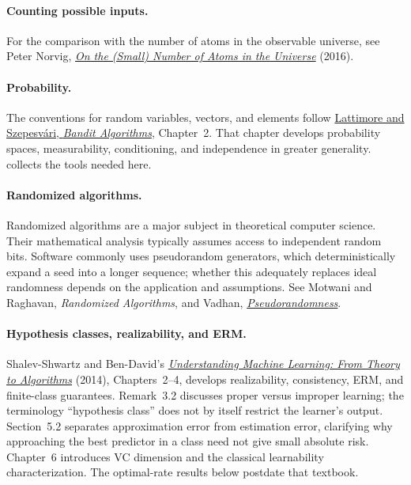 \documentclass[11pt,twoside]{article}
\theoremstyle{definition}
\theoremstyle{remark}
\begin{document}
\paragraph{Counting possible inputs.}
For the comparison with the number of atoms in the observable universe, see
Peter Norvig,
\href{https://www.norvig.com/atoms.html}{\emph{On the (Small) Number of Atoms
in the Universe}} (2016).

\paragraph{Probability.}
The conventions for random variables, vectors, and elements follow
\href{https://tor-lattimore.com/downloads/book/book.pdf}{Lattimore and
Szepesv\'ari, \emph{Bandit Algorithms}}, Chapter~2. That chapter develops
probability spaces, measurability, conditioning, and independence in greater
generality.  collects the tools needed here.

\paragraph{Randomized algorithms.}
Randomized algorithms are a major subject in theoretical computer science.
Their mathematical analysis typically assumes access to independent random
bits. Software commonly uses pseudorandom generators, which deterministically
expand a seed into a longer sequence; whether this adequately replaces ideal
randomness depends on the application and assumptions. See Motwani and
Raghavan, \emph{Randomized Algorithms}, and Vadhan,
\href{https://people.seas.harvard.edu/~salil/pseudorandomness/}{\emph{Pseudorandomness}}.

\paragraph{Hypothesis classes, realizability, and ERM.}
Shalev-Shwartz and Ben-David's
\href{https://www.cs.huji.ac.il/~shais/UnderstandingMachineLearning/understanding-machine-learning-theory-algorithms.pdf}{\emph{Understanding
Machine Learning: From Theory to Algorithms}} (2014), Chapters~2--4,
develops realizability, consistency, ERM, and finite-class guarantees.
Remark~3.2 discusses proper versus improper learning; the terminology
``hypothesis class'' does not by itself restrict the learner's output.
Section~5.2 separates approximation error from estimation error, clarifying
why approaching the best predictor in a class need not give small absolute
risk. Chapter~6 introduces VC dimension and the classical learnability
characterization. The optimal-rate results below postdate that textbook.
\end{document}
